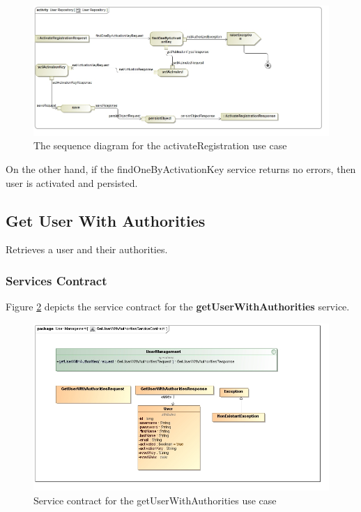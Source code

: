 \begin{figure}[H]
	\begin{center}
		\includegraphics[scale=0.5]{../Diagrams and Charts/Users/Activate registration sequence diagram.jpg}
		\caption{The sequence diagram for the activateRegistration use case}
		\label{fig:activateRegistrationSD}
	\end{center}	
\end{figure}
On the other hand, if the findOneByActivationKey service returns no errors, then user is activated and persisted.

\subsection{Get User With Authorities}
Retrieves a user and their authorities.

\subsubsection{Services Contract}
Figure \ref{fig:GetUserWithAuthoritiesServicesContract} depicts the service
contract for the \textbf{getUserWithAuthorities} service.

\begin{figure}[H]
	\begin{center}
		\includegraphics[scale=0.55]{../Diagrams and Charts/Users/GetUserWithAuthoritiesServiceContract.jpg}
		\caption{Service contract for the getUserWithAuthorities use case}
		\label{fig:GetUserWithAuthoritiesServicesContract}
	\end{center}
\end{figure}


